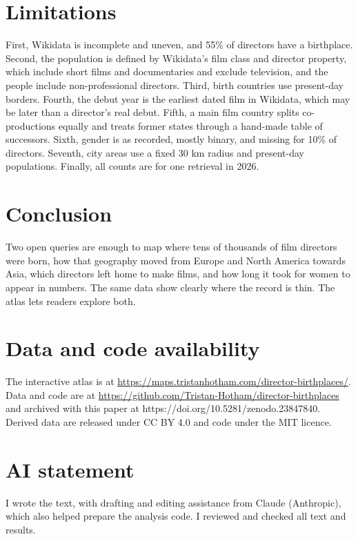 \documentclass[11pt,a4paper]{article}
\begin{document}
\section{Limitations}
First, Wikidata is incomplete and uneven, and 55\% of directors have a birthplace. Second, the population is defined by Wikidata's film class and director property, which include short films and documentaries and exclude television, and the people include non-professional directors. Third, birth countries use present-day borders. Fourth, the debut year is the earliest dated film in Wikidata, which may be later than a director's real debut. Fifth, a main film country splits co-productions equally and treats former states through a hand-made table of successors. Sixth, gender is as recorded, mostly binary, and missing for 10\% of directors. Seventh, city areas use a fixed 30 km radius and present-day populations. Finally, all counts are for one retrieval in 2026.

\section{Conclusion}
Two open queries are enough to map where tens of thousands of film directors were born, how that geography moved from Europe and North America towards Asia, which directors left home to make films, and how long it took for women to appear in numbers. The same data show clearly where the record is thin. The atlas lets readers explore both.

\section*{Data and code availability}
The interactive atlas is at \url{https://maps.tristanhotham.com/director-birthplaces/}. Data and code are at \url{https://github.com/Tristan-Hotham/director-birthplaces} and archived with this paper at https://doi.org/10.5281/zenodo.23847840. Derived data are released under CC BY 4.0 and code under the MIT licence.

\section*{AI statement}
I wrote the text, with drafting and editing assistance from Claude (Anthropic), which also helped prepare the analysis code. I reviewed and checked all text and results.
\end{document}
